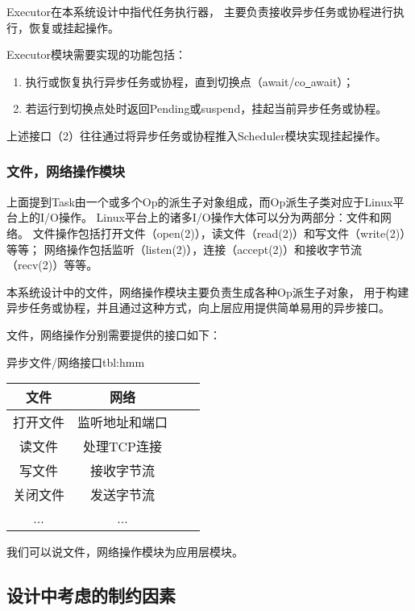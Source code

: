 \documentclass[supercite]{HustGraduPaper}
\theoremstyle{definition}
\begin{document}
Executor在本系统设计中指代任务执行器，
主要负责接收异步任务或协程进行执行，恢复或挂起操作。\par

Executor模块需要实现的功能包括：

\begin{enumerate}
  \item 执行或恢复执行异步任务或协程，直到切换点（await/co\underline{~}await）；
  \item 若运行到切换点处时返回Pending或suspend，挂起当前异步任务或协程。
\end{enumerate}

上述接口（2）往往通过将异步任务或协程推入Scheduler模块实现挂起操作。\par

\subsubsection{文件，网络操作模块}

上面提到Task由一个或多个Op的派生子对象组成，而Op派生子类对应于Linux平台上的I/O操作。
Linux平台上的诸多I/O操作大体可以分为两部分：文件和网络。
文件操作包括打开文件（open(2)），读文件（read(2)）和写文件（write(2)）等等；
网络操作包括监听（listen(2)），连接（accept(2)）和接收字节流（recv(2)）等等。\par

本系统设计中的文件，网络操作模块主要负责生成各种Op派生子对象，
用于构建异步任务或协程，并且通过这种方式，向上层应用提供简单易用的异步接口。\par

文件，网络操作分别需要提供的接口如下：

\begin{generaltab}{异步文件/网络接口}{tbl:hmm}
  \begin{tabular}{c|ccc}
    \toprule
    文件 & 网络 \\
    \midrule
    打开文件 & 监听地址和端口 \\
    读文件 & 处理TCP连接 \\
    写文件 & 接收字节流 \\
    关闭文件 & 发送字节流 \\
    ... & ... \\
    \bottomrule
  \end{tabular}
\end{generaltab}

我们可以说文件，网络操作模块为应用层模块。\par

\subsection{设计中考虑的制约因素}
\end{document}
